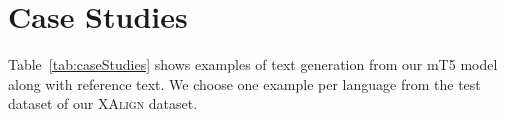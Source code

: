 \documentclass[11pt]{article}
\begin{document}
\section{Case Studies}
Table~\ref{tab:caseStudies} shows examples of text generation from our mT5 model along with reference text. We choose one example per language from the test dataset of our \textsc{XAlign} dataset.

\end{document}
